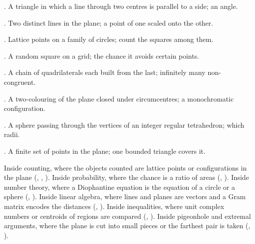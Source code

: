 \begin{ladder}
\item {}. A triangle in which a line through two centres is parallel to a side; an angle.
\item {}. Two distinct lines in the plane; a point of one scaled onto the other.
\item {}. Lattice points on a family of circles; count the squares among them.
\item {}. A random square on a grid; the chance it avoids certain points.
\item {}. A chain of quadrilaterals each built from the last; infinitely many non-congruent.
\item {}. A two-colouring of the plane closed under circumcentres; a monochromatic configuration.
\item {}. A sphere passing through the vertices of an integer regular tetrahedron; which radii.
\item {}. A finite set of points in the plane; one bounded triangle covers it.
\end{ladder}

\begin{hides}
Inside counting, where the objects counted are lattice points or configurations in the plane (, , ). Inside probability, where the chance is a ratio of areas (, ). Inside number theory, where a Diophantine equation is the equation of a circle or a sphere (, ). Inside linear algebra, where lines and planes are vectors and a Gram matrix encodes the distances (, ). Inside inequalities, where unit complex numbers or centroids of regions are compared (, ). Inside pigeonhole and extremal arguments, where the plane is cut into small pieces or the farthest pair is taken (, ).
\end{hides}
